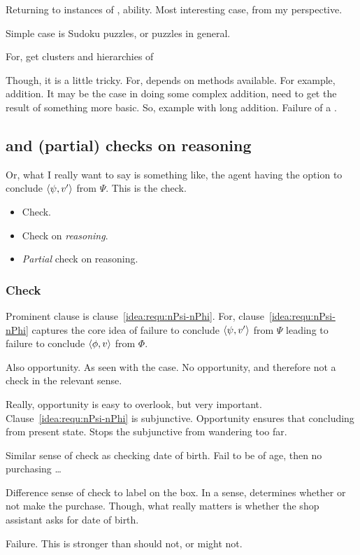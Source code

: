 \begin{note}
  Returning to instances of , ability.
  Most interesting case, from my perspective.

  Simple case is Sudoku puzzles, or puzzles in general.

  For, get clusters and hierarchies of 

  Though, it is a little tricky.
  For, depends on methods available.
  For example, addition.
  It may be the case in doing some complex addition, need to get the result of something more basic.
  So, example with long addition.
  Failure of a \requ{}.
\end{note}

\subsection{ and (partial) checks on reasoning}
\label{cha:zS:sec:requs:checks}

\begin{note}
  Or, what I really want to say is something like, the agent having the option to conclude \(\langle \psi, v' \rangle\) from \(\Psi\).
  This is the check.
\end{note}

\begin{note}
  \begin{itemize}
  \item Check.
  \item Check on \emph{reasoning}.
  \item \emph{Partial} check on reasoning.
  \end{itemize}
\end{note}

\subsubsection{Check}

\begin{note}[Check]
  Prominent clause is clause~\ref{idea:requ:nPsi-nPhi}.
  For, clause~\ref{idea:requ:nPsi-nPhi} captures the core idea of failure to conclude \(\langle \psi, v' \rangle\) from \(\Psi\) leading to failure to conclude \(\langle \phi, v \rangle\) from \(\Phi\).

  Also opportunity.
  As seen with the \citeauthor{Dretske:1970to} case.
  No opportunity, and therefore not a check in the relevant sense.

  Really, opportunity is easy to overlook, but very important.
  Clause~\ref{idea:requ:nPsi-nPhi} is subjunctive.
  Opportunity ensures that concluding from present state.
  Stops the subjunctive from wandering too far.

  Similar sense of check as checking date of birth.
  Fail to be of age, then no purchasing \dots

  Difference sense of check to label on the box.
  In a sense, determines whether or not make the purchase.
  Though, what really matters is whether the shop assistant asks for date of birth.

  Failure.
  This is stronger than should not, or might not.
\end{note}

